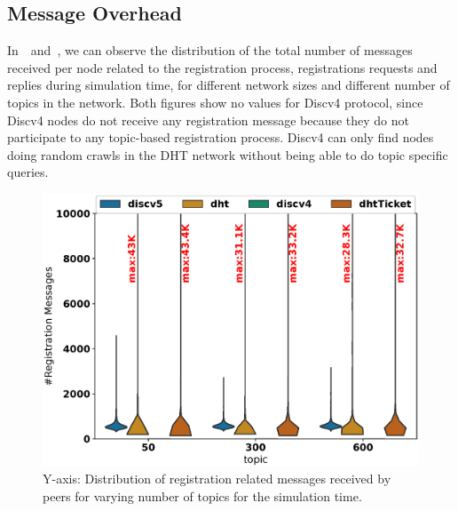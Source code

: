 \subsection{Message Overhead}

In~~and~,  we can observe the distribution of the total number of messages received per node related to the registration process, \ie registrations requests and replies during simulation time,  for different network sizes and different number of topics in the network.
Both figures show no values for Discv4 protocol, since Discv4 nodes do not receive any registration message because they do not participate to any topic-based registration process.  Discv4 can only find nodes doing random crawls in the DHT network without being able to do topic specific queries. 

\begin{figure}
\centering
\includegraphics[width=\linewidth]{results/efficiency/violin_topic_registrationMsgs.eps}
\caption{Y-axis: Distribution of registration related messages received by peers for varying number of topics for the simulation time.}
\label{fig:regMsgsPerTopic}
\end{figure}

